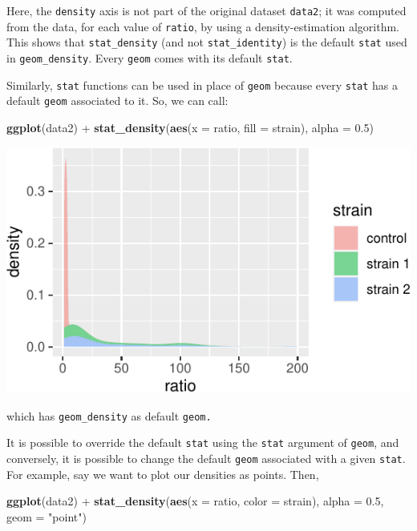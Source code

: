 \documentclass[]{book}
\newenvironment{Shaded}{}{}
\newcommand{\DataTypeTok}[1]{\textcolor[rgb]{0.56,0.13,0.00}{#1}}
\newcommand{\FloatTok}[1]{\textcolor[rgb]{0.25,0.63,0.44}{#1}}
\newcommand{\KeywordTok}[1]{\textcolor[rgb]{0.00,0.44,0.13}{\textbf{#1}}}
\newcommand{\NormalTok}[1]{#1}
\newcommand{\OperatorTok}[1]{\textcolor[rgb]{0.40,0.40,0.40}{#1}}
\newcommand{\StringTok}[1]{\textcolor[rgb]{0.25,0.44,0.63}{#1}}
\begin{document}
Here, the \texttt{density} axis is not part of the original dataset \texttt{data2}; it was computed from the data, for each value of \texttt{ratio}, by using a density-estimation algorithm. This shows that \texttt{stat\_density} (and not \texttt{stat\_identity}) is the default \texttt{stat} used in \texttt{geom\_density}. Every \texttt{geom} comes with its default \texttt{stat}.

Similarly, \texttt{stat} functions can be used in place of \texttt{geom} because every \texttt{stat} has a default \texttt{geom} associated to it. So, we can call:

\begin{Shaded}
\begin{Highlighting}[]
\KeywordTok{ggplot}\NormalTok{(data2) }\OperatorTok{+}
\StringTok{  }\KeywordTok{stat_density}\NormalTok{(}\KeywordTok{aes}\NormalTok{(}\DataTypeTok{x =}\NormalTok{ ratio, }\DataTypeTok{fill =}\NormalTok{ strain), }\DataTypeTok{alpha =} \FloatTok{0.5}\NormalTok{)}
\end{Highlighting}
\end{Shaded}

\begin{center}\includegraphics[width=\textwidth]{TRES-Tidy-Tutorial_files/figure-latex/unnamed-chunk-114-1} \end{center}

which has \texttt{geom\_density} as default \texttt{geom.}

It is possible to override the default \texttt{stat} using the \texttt{stat} argument of \texttt{geom}, and conversely, it is possible to change the default \texttt{geom} associated with a given \texttt{stat}. For example, say we want to plot our densities as points. Then,

\begin{Shaded}
\begin{Highlighting}[]
\KeywordTok{ggplot}\NormalTok{(data2) }\OperatorTok{+}
\StringTok{  }\KeywordTok{stat_density}\NormalTok{(}\KeywordTok{aes}\NormalTok{(}\DataTypeTok{x =}\NormalTok{ ratio, }\DataTypeTok{color =}\NormalTok{ strain), }\DataTypeTok{alpha =} \FloatTok{0.5}\NormalTok{, }\DataTypeTok{geom =} \StringTok{"point"}\NormalTok{)}
\end{Highlighting}
\end{Shaded}
\end{document}
